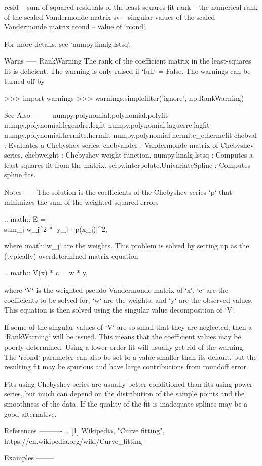 \begin{DoxyVerb}
    resid -- sum of squared residuals of the least squares fit
    rank -- the numerical rank of the scaled Vandermonde matrix
    sv -- singular values of the scaled Vandermonde matrix
    rcond -- value of `rcond`.

    For more details, see `numpy.linalg.lstsq`.

Warns
-----
RankWarning
    The rank of the coefficient matrix in the least-squares fit is
    deficient. The warning is only raised if `full` = False.  The
    warnings can be turned off by

    >>> import warnings
    >>> warnings.simplefilter('ignore', np.RankWarning)

See Also
--------
numpy.polynomial.polynomial.polyfit
numpy.polynomial.legendre.legfit
numpy.polynomial.laguerre.lagfit
numpy.polynomial.hermite.hermfit
numpy.polynomial.hermite_e.hermefit
chebval : Evaluates a Chebyshev series.
chebvander : Vandermonde matrix of Chebyshev series.
chebweight : Chebyshev weight function.
numpy.linalg.lstsq : Computes a least-squares fit from the matrix.
scipy.interpolate.UnivariateSpline : Computes spline fits.

Notes
-----
The solution is the coefficients of the Chebyshev series `p` that
minimizes the sum of the weighted squared errors

.. math:: E = \\sum_j w_j^2 * |y_j - p(x_j)|^2,

where :math:`w_j` are the weights. This problem is solved by setting up
as the (typically) overdetermined matrix equation

.. math:: V(x) * c = w * y,

where `V` is the weighted pseudo Vandermonde matrix of `x`, `c` are the
coefficients to be solved for, `w` are the weights, and `y` are the
observed values.  This equation is then solved using the singular value
decomposition of `V`.

If some of the singular values of `V` are so small that they are
neglected, then a `RankWarning` will be issued. This means that the
coefficient values may be poorly determined. Using a lower order fit
will usually get rid of the warning.  The `rcond` parameter can also be
set to a value smaller than its default, but the resulting fit may be
spurious and have large contributions from roundoff error.

Fits using Chebyshev series are usually better conditioned than fits
using power series, but much can depend on the distribution of the
sample points and the smoothness of the data. If the quality of the fit
is inadequate splines may be a good alternative.

References
----------
.. [1] Wikipedia, "Curve fitting",
       https://en.wikipedia.org/wiki/Curve_fitting

Examples
--------\end{DoxyVerb}
 \mbox{\label{namespacenumpy_1_1polynomial_1_1chebyshev_ad77705a093f59a558144d099b7bb9c95}} 
